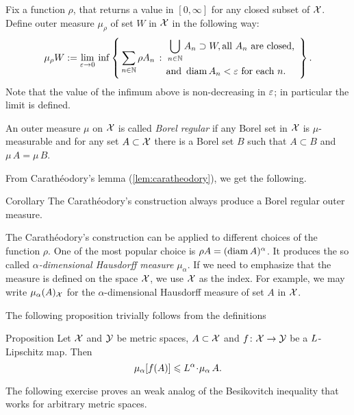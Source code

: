 Fix a function $\rho$, that returns a value in $[0,\infty]$
for any closed subset of $\mathcal{X}$.
Define outer measure $\mu_\rho$ of set $W$ in $\mathcal{X}$ in the following way:
$$\mu_\rho W
\df
\lim_{\eps\to0}
\,
\inf
\set{\sum_{n\in\NN}\rho A_n}
{\begin{aligned}
&\bigcup_{n\in\NN}A_n\supset W, \text{all}\  
A_n
\ \text{are closed,}\ 
\\
&
\text{and}\ \diam A_n<\eps\ \text{for each}\ n.
 \end{aligned}
}.$$
Note that
the value of the infimum above is non-decreasing in $\varepsilon$;
in particular the limit is defined.

An outer measure $\mu$ on $\mathcal{X}$ is called \emph{Borel regular} if any Borel set in $\mathcal{X}$ is $\mu$-measurable and for any set $A\subset \mathcal{X}$ there is a Borel set $B$ such that $A\subset B$ and $\mu\, A=\mu\, B$. 

From Carath\'eodory's lemma (\ref{lem:caratheodory}), we get the following.

\begin{thm}{Corollary}
The Carath\'eodory's construction always produce a Borel regular outer measure.
\end{thm}

The Carath\'eodory's construction can be applied to different choices of the function $\rho$.
One of the most popular choice is $\rho A=(\operatorname{\rm diam}\nolimits A)^\alpha$.
It produces the so called \index{Hausdorff measure}\emph{$\alpha$-dimensional Hausdorff measure} $\mu_\alpha$.
If we need to emphasize that the measure is defined on the space $\mathcal{X}$, we use $\mathcal{X}$ as the index.
For example, we may write $\mu_\alpha(A)_{\mathcal{X}}$ for the $\alpha$-dimensional Hausdorff measure of set $A$ in $\mathcal{X}$.

The following proposition trivially follows from the definitions

\begin{thm}{Proposition}\label{prop:bilip-measure}
Let $\mathcal{X}$ and $\mathcal{Y}$ be metric spaces, $A\subset \mathcal{X}$
and
 $f\colon \mathcal{X}\to \mathcal{Y}$ be a $L$-Lipschitz map. 
Then 
\[\mu_\alpha [f(A)]\le \Lip^\alpha\cdot\mu_\alpha\, A.\]

\end{thm}

The following exercise proves an weak analog of the Besikovitch inequality that works for arbitrary metric spaces.

